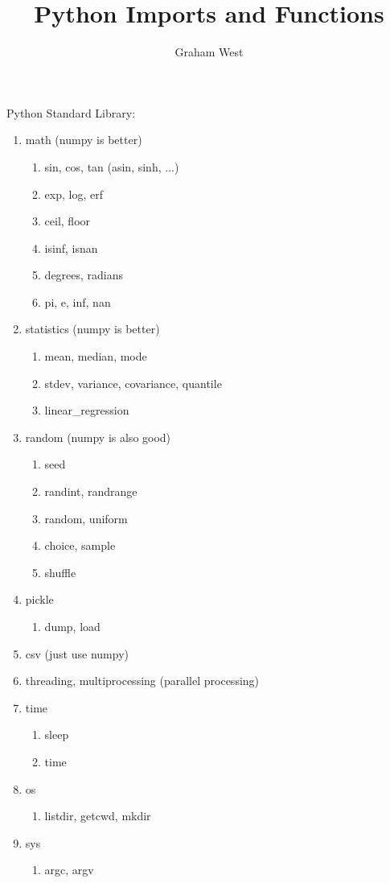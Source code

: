 \documentclass{article}
\begin{document}
\title{Python Imports and Functions}
\author{Graham West}
\date{}

\maketitle

\large

Python Standard Library:
\begin{enumerate}
	\item math (numpy is better)
	\begin{enumerate}
		\item sin, cos, tan (asin, sinh, ...)
		\item exp, log, erf
		\item ceil, floor
		\item isinf, isnan
		\item degrees, radians
		\item pi, e, inf, nan
	\end{enumerate}
	\item statistics (numpy is better)
	\begin{enumerate}
		\item mean, median, mode
		\item stdev, variance, covariance, quantile
		\item linear\_regression
	\end{enumerate}
	\item random (numpy is also good)
	\begin{enumerate}
		\item seed
		\item randint, randrange
		\item random, uniform
		\item choice, sample
		\item shuffle
	\end{enumerate}
	\item pickle
	\begin{enumerate}
		\item dump, load
	\end{enumerate}
	\item csv (just use numpy)
	\item threading, multiprocessing (parallel processing)
	\item time
	\begin{enumerate}
		\item sleep
		\item time
	\end{enumerate}
	\item os
	\begin{enumerate}
		\item listdir, getcwd, mkdir
	\end{enumerate}
	\item sys
	\begin{enumerate}
		\item argc, argv
	\end{enumerate}
\end{enumerate}
\end{document}
